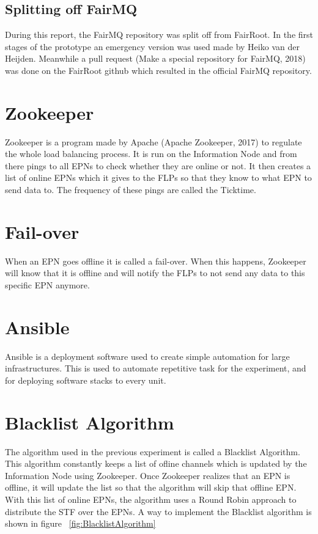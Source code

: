 \subsection{Splitting off FairMQ}
During this report, the FairMQ repository was split off from FairRoot. In the first stages of the prototype an emergency version was used made by Heiko van der Heijden. Meanwhile a pull request 
(Make a special repository for FairMQ, 2018) was done on the FairRoot github which resulted in the official FairMQ repository.

\section{Zookeeper}
Zookeeper is a program made by Apache (Apache Zookeeper, 2017) to regulate the whole load balancing process. It is run on the Information Node and from there pings to all EPNs to check whether they are online or not. It then creates a list of online EPNs which it gives to the FLPs so that they know to what EPN to send data to. The frequency of these pings are called the Ticktime. 

\section{Fail-over}
When an EPN goes offline it is called a fail-over. When this happens, Zookeeper will know that it is offline and will notify the FLPs to not send any data to this specific EPN anymore. 

\section{Ansible}
Ansible is a deployment software used to create simple automation for large infrastructures. This is used to automate repetitive task for the experiment, and for deploying software stacks to every unit. 

\section{Blacklist Algorithm}
The algorithm used in the previous experiment is called a Blacklist Algorithm. This algorithm constantly keeps a list of ofline channels which is updated by the Information Node using Zookeeper. Once Zookeeper realizes that an EPN is offline, it will update the list so that the algorithm will skip that offline EPN. With this list of online EPNs, the algorithm uses a Round Robin approach to distribute the STF over the EPNs. A way to implement the Blacklist algorithm is shown in figure ~\ref{fig:BlacklistAlgorithm}

